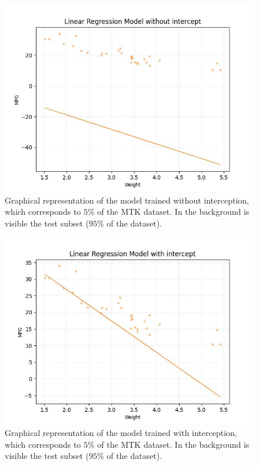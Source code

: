 \documentclass[9pt,technote]{IEEEtran}
\begin{document}
		\begin{figure}
			\centering
  			\includegraphics[width=1\linewidth]{figures/mkt2dim_without_intercept.jpg}
  			\caption{Graphical representation of the model trained without interception, which corresponds to $5\%$ of the MTK dataset. In the background is visible the test subset ($95\%$ of the dataset).}
  			\label{fig::mkt2dim_without_intercept}
		\end{figure}
		
		\begin{figure}
			\centering
  			\includegraphics[width=1\linewidth]{figures/mkt2dim_with_intercept.jpg}
  			\caption{Graphical representation of the model trained with interception, which corresponds to $5\%$ of the MTK dataset. In the background is visible the test subset ($95\%$ of the dataset).}
  			\label{fig::mkt2dim_with_intercept}
		\end{figure}
		
\end{document}
